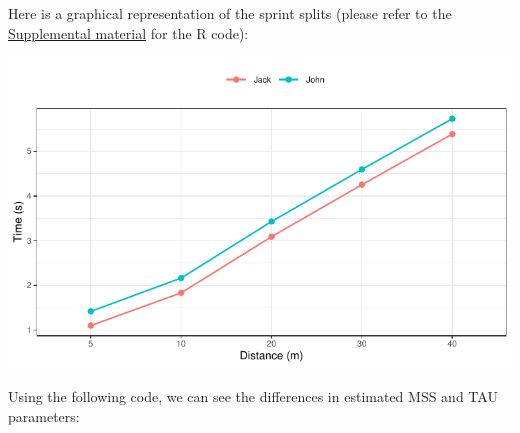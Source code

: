 \documentclass[fleqn,10pt]{wlpeerj} %
\begin{document}
Here is a graphical representation of the sprint splits (please refer to the \protect\hyperlink{supplemental-material}{Supplemental material} for the R code):

\small

\begin{center}\includegraphics[width=0.9\linewidth]{paper_files/figure-latex/unnamed-chunk-25-1} \end{center}

\normalsize

Using the following code, we can see the differences in estimated MSS and TAU parameters:

\small
\end{document}
